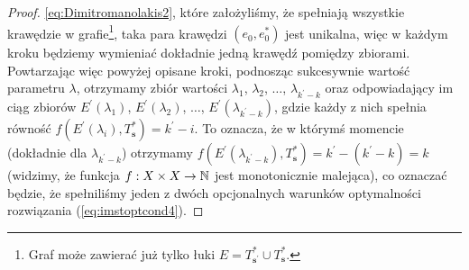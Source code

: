 \begin{proof}
\ref{eq:Dimitromanolakis2}, które założyliśmy, że spełniają wszystkie krawędzie w grafie\footnote{Graf może zawierać już tylko łuki $E = T^{\ast}_{\textbf{s}^{\prime}} \cup T^{\ast}_{\textbf{s}}$.}, taka para krawędzi $\left( e_{0}, e_{0}^{\ast} \right)$ jest unikalna, więc w każdym kroku będziemy wymieniać dokładnie jedną krawędź pomiędzy zbiorami. Powtarzając więc powyżej opisane kroki, podnosząc sukcesywnie wartość parametru $\lambda$, otrzymamy zbiór wartości $\lambda_{1}$, $\lambda_{2}$, $\dots$, $\lambda_{k^{\prime} - k}$ oraz odpowiadający im ciąg zbiorów $E^{\prime} \left( \lambda_{1} \right)$, $E^{\prime} \left( \lambda_{2} \right)$, $\dots$, $E^{\prime} \left( \lambda_{k^{\prime} - k} \right)$, gdzie każdy z nich spełnia równość $f \left( E^{\prime} \left( \lambda_{i} \right), T^{\ast}_{\textbf{s}} \right) = k^{\prime} - i$. To oznacza, że w którymś momencie (dokładnie dla $\lambda_{k^{\prime} - k}$) otrzymamy $f \left( E^{\prime} \left( \lambda_{k^{\prime} - k} \right), T^{\ast}_{\textbf{s}} \right) = k^{\prime} - \left( k^{\prime} - k \right) = k$ (widzimy, że funkcja $f : X \times X \rightarrow \mathbb{N}$ jest monotonicznie malejąca), co oznaczać będzie, że spełniliśmy jeden z dwóch opcjonalnych warunków optymalności rozwiązania (\ref{eq:imstoptcond4}).
\end{proof}


